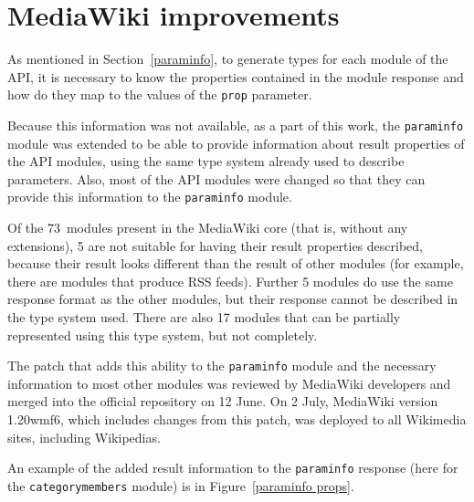 \chapter{MediaWiki improvements}
\label{mw improvements}

As mentioned in Section~\ref{paraminfo}, to generate types for each module of the \ac{API},
it is necessary to know the properties contained in the module response
and how do they map to the values of the \texttt{prop} parameter.

Because this information was not available, as a part of this work,
the \texttt{paraminfo} module was extended to be able to provide information about result properties
of the \ac{API} modules, using the same type system already used to describe parameters.
Also, most of the \ac{API} modules were changed so that they can provide this information to the \texttt{paraminfo} module.

Of the 73~modules present in the MediaWiki core (that is, without any extensions),
5 are not suitable for having their result properties described,
because their result looks different than the result of other modules (for example, there are modules that produce \acs{RSS} feeds).
Further 5 modules do use the same response format as the other modules,
but their response cannot be described in the type system used.
There are also 17 modules that can be partially represented using this type system, but not completely.

The patch that adds this ability to the \texttt{paraminfo} module and the necessary
information to most other modules was reviewed by MediaWiki developers and merged into the official repository
on 12 June.
On 2 July, MediaWiki version 1.20wmf6, which includes changes from this patch, was deployed to all Wikimedia sites, including Wikipedias.

An example of the added result information to the \texttt{paraminfo} response (here for the \texttt{categorymembers} module) is in Figure~\ref{paraminfo props}.

\medskip

